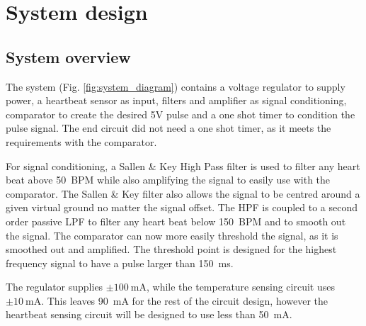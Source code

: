 
\chapter{System design}
\section{System overview} \label{sec:system}
The system (Fig. \ref{fig:system_diagram}) contains a voltage regulator \cite{Marais2020} to supply power, a heartbeat sensor as input, filters and amplifier as signal conditioning, comparator to create the desired 5V pulse and a one shot timer to condition the pulse signal. The end circuit did not need a one shot timer, as it meets the requirements with the comparator.
\par
For signal conditioning, a Sallen \& Key High Pass filter is used to filter any heart beat above \SI{50}{BPM} while also amplifying the signal to easily use with the comparator. The Sallen \& Key filter also allows the signal to be centred around a given virtual ground no matter the signal offset. The HPF is coupled to a second order passive LPF to filter any heart beat below \SI{150}{BPM} and to smooth out the signal. The comparator can now more easily threshold the signal, as it is smoothed out and amplified. The threshold point is designed for the highest frequency signal to have a pulse larger than \SI{150}{\milli\second}.
\par
The regulator supplies $\pm\SI{100}{\milli\ampere}$, while the temperature sensing circuit \cite{Marais2020} uses $\pm\SI{10}{\milli\ampere}$. This leaves \SI{90}{\milli\ampere} for the rest of the circuit design, however the heartbeat sensing circuit will be designed to use less than \SI{50}{\milli\ampere}.



